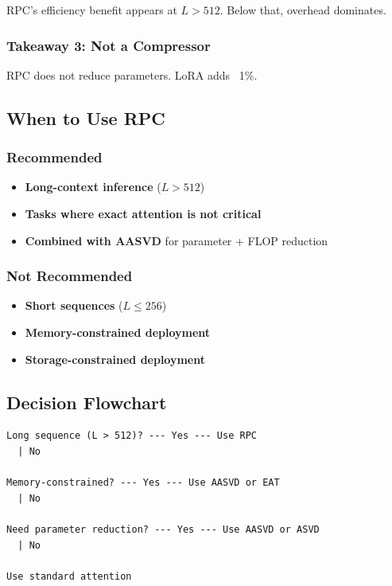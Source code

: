 RPC's efficiency benefit appears at $L > 512$. Below that, overhead 
dominates.

\subsubsection{Takeaway 3: Not a Compressor}

RPC does not reduce parameters. LoRA adds ~1\%.

\subsection{When to Use RPC}

\subsubsection{Recommended}

\begin{itemize}
\item \textbf{Long-context inference} ($L > 512$)
\item \textbf{Tasks where exact attention is not critical}
\item \textbf{Combined with AASVD} for parameter + FLOP reduction

\end{itemize}
\subsubsection{Not Recommended}

\begin{itemize}
\item \textbf{Short sequences} ($L \leq 256$)
\item \textbf{Memory-constrained deployment}
\item \textbf{Storage-constrained deployment}

\end{itemize}
\subsection{Decision Flowchart}

\begin{lstlisting}
Long sequence (L > 512)? --- Yes --- Use RPC
  | No
   
Memory-constrained? --- Yes --- Use AASVD or EAT
  | No
   
Need parameter reduction? --- Yes --- Use AASVD or ASVD
  | No
   
Use standard attention
\end{lstlisting}

